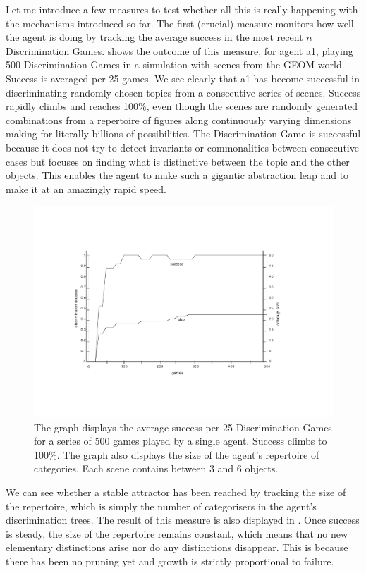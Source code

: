 Let me introduce a few measures 
to test whether all this is really happening with the 
mechanisms introduced so far.
The first (crucial) measure monitors 
how well the agent is doing by tracking
the average success in the most recent $n$ Discrimination Games. 
 shows the outcome of this measure, for 
agent {\bfshape a1}, playing 500 Discrimination Games in a
simulation with scenes from the GEOM world. 
Success is averaged per 25 games. We see clearly that {\bfshape a1}
has become successful in discriminating randomly chosen topics
from a consecutive series of scenes. Success rapidly climbs and
reaches 100\%, even though the scenes are randomly
generated combinations from a repertoire of figures
along continuously varying 
dimensions making for literally billions of possibilities. 
The Discrimination Game is successful because it does 
not try to detect invariants or commonalities between consecutive 
cases but focuses on finding what is distinctive between the topic 
and the other objects. This enables the agent to make
such a gigantic abstraction leap and to make it at an amazingly 
rapid speed. 

\begin{figure}[htbp]
  \centerline{\includegraphics[width=\textwidth]{chap4/figs/avsuc.pdf}}
\caption{\label{avsuc}The graph displays the 
average success per 25 Discrimination Games for a
series of 500 games played by a single agent. Success climbs
to 100\%. The graph also displays the size of the 
agent's repertoire of categories. Each scene contains
between 3 and 6 objects.}
\end{figure}

We can see whether a stable attractor has been reached by 
tracking the size of the repertoire, which is
simply the number of 
categorisers in the agent's discrimination trees. 
The result of this measure is also displayed in 
. Once success is steady, the
size of the repertoire remains 
constant, which means that no new 
elementary distinctions arise nor do any distinctions
disappear. This is because there has been no pruning yet and 
growth is strictly proportional to failure. 

